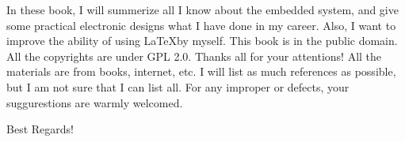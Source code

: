 \begin{frontmatter}
	In these book, I will summerize all I know about the embedded system, and give some practical electronic designs what I have done in my career. Also, I want to improve the ability of using \LaTeX  by myself. This book is in the public domain. All the copyrights are under GPL 2.0.
	Thanks all for your attentions! All the materials are from books, internet, etc. I will list as much references as possible, but I am not sure that I can list all. For any improper or defects, your suggurestions are warmly welcomed.
	
	Best Regards!
\end{frontmatter}

	
